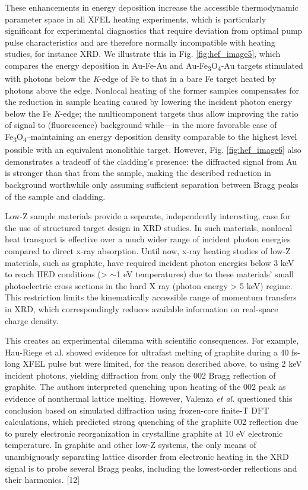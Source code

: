 These enhancements in energy deposition increase the accessible
thermodynamic parameter space in all XFEL heating experiments, which is
particularly significant for experimental diagnostics that require
deviation from optimal pump pulse characteristics and are therefore
normally incompatible with heating studies, for instance XRD. We
illustrate this in Fig. \ref{fig:hef_image5}, which compares the energy deposition in
Au-Fe-Au and Au-Fe\textsubscript{3}O\textsubscript{4}-Au targets
stimulated with photons below the \emph{K}-edge of Fe to that in a bare
Fe target heated by photons above the edge. Nonlocal heating of the
former samples compensates for the reduction in sample heating caused by
lowering the incident photon energy below the Fe \emph{K}-edge; the
multicomponent targets thus allow improving the ratio of signal to
(fluorescence) background while---in the more favorable case of
Fe\textsubscript{3}O\textsubscript{4}--maintaining an energy deposition
density comparable to the highest level possible with an equivalent
monolithic target. However, Fig. \ref{fig:hef_image6} also demonstrates a tradeoff of the
cladding's presence: the diffracted signal from Au is stronger than that
from the sample, making the described reduction in background worthwhile
only assuming sufficient separation between Bragg peaks of the sample
and cladding.

Low-Z sample materials provide a separate, independently interesting,
case for the use of structured target design in XRD studies. In such
materials, nonlocal heat transport is effective over a much wider range
of incident photon energies compared to direct x-ray absorption. Until
now, x-ray heating studies of low-Z materials, such as graphite, have
required incident photon energies below 3 keV to reach HED conditions
(\textgreater{} $\sim$1 eV temperatures) due to these
materials' small photoelectric cross sections in the hard X ray (photon
energy \textgreater{} 5 keV) regime. This restriction limits the
kinematically accessible range of momentum transfers in XRD, which
correspondingly reduces available information on real-space charge
density.

This creates an experimental dilemma with scientific consequences. For
example, Hau-Riege et al.\cite{hau2012ultrafast} showed evidence for ultrafast melting
of graphite during a 40 fs-long XFEL pulse but were limited, for the
reason described above, to using 2 keV incident photons, yielding
diffraction from only the 002 Bragg reflection of graphite. The authors
interpreted quenching upon heating of the 002 peak as evidence of
nonthermal lattice melting. However, Valenza \emph{et al.}\cite{valenza2016warm}
questioned this conclusion based on simulated diffraction using
frozen-core finite-T DFT calculations, which predicted strong quenching
of the graphite 002 reflection due to purely electronic reorganization
in crystalline graphite at 10 eV electronic temperature. In graphite and
other low-Z systems, the only means of unambiguously separating lattice
disorder from electronic heating in the XRD signal is to probe several
Bragg peaks, including the lowest-order reflections and their harmonics.
{[}12{]}

